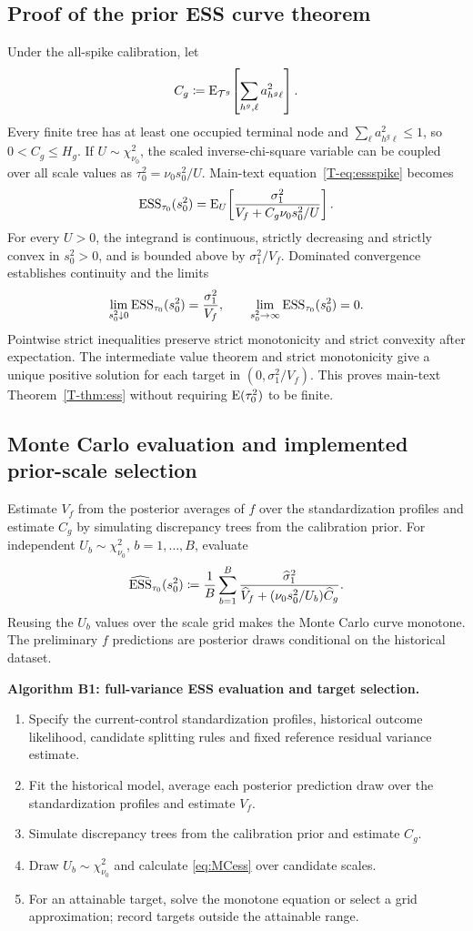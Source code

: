 \subsection{Proof of the prior ESS curve theorem}\label{sec:B.4}
Under the all-spike calibration, let
\[
C_g\coloneqq
\operatorname{E}_{\mathcal T^g}\!\left[\sum_{h^g,\ell}a_{h^g\ell}^2\right].
\]
Every finite tree has at least one occupied terminal node and
$\sum_\ell a_{h^g\ell}^2\leq1$, so $0<C_g\leq H_g$. If
$U\sim\chi^2_{\nu_0}$, the scaled inverse-chi-square variable can be coupled over all scale values as $\tau_0^2=\nu_0s_0^2/U$. Main-text equation~\ref{T-eq:essspike} becomes
\[
\operatorname{ESS}_{\tau_0}(s_0^2)
=\operatorname{E}_U\!\left[
\frac{\sigma_1^2}{V_f+C_g\nu_0s_0^2/U}
\right].
\]
For every $U>0$, the integrand is continuous, strictly decreasing and strictly convex in $s_0^2>0$, and is bounded above by $\sigma_1^2/V_f$. Dominated convergence establishes continuity and the limits
\[
\lim_{s_0^2\downarrow0}\operatorname{ESS}_{\tau_0}(s_0^2)
=\frac{\sigma_1^2}{V_f},
\qquad
\lim_{s_0^2\to\infty}\operatorname{ESS}_{\tau_0}(s_0^2)=0.
\]
Pointwise strict inequalities preserve strict monotonicity and strict convexity after expectation. The intermediate value theorem and strict monotonicity give a unique positive solution for each target in $(0,\sigma_1^2/V_f)$. This proves main-text Theorem~\ref{T-thm:ess} without requiring $\operatorname{E}(\tau_0^2)$ to be finite.

\subsection{Monte Carlo evaluation and implemented prior-scale selection}\label{sec:B.5}
Estimate $V_f$ from the posterior averages of $f$ over the standardization profiles and estimate
$C_g$ by simulating discrepancy trees from the calibration prior. For independent
$U_b\sim\chi^2_{\nu_0}$, $b=1,\ldots,B$, evaluate
\begin{equation}\label{eq:MCess}
\widehat{\operatorname{ESS}}_{\tau_0}(s_0^2)
\coloneqq\frac1B\sum_{b=1}^B
\frac{\widehat\sigma_1^2}
{\widehat V_f+(\nu_0s_0^2/U_b)\widehat C_g}.
\end{equation}
Reusing the $U_b$ values over the scale grid makes the Monte Carlo curve monotone. The preliminary $f$ predictions are posterior draws conditional on the historical dataset.

\noindent\textbf{Algorithm B1: full-variance ESS evaluation and target selection.}
\begin{enumerate}
\item Specify the current-control standardization profiles, historical outcome likelihood, candidate splitting rules and fixed reference residual variance estimate.
\item Fit the historical model, average each posterior prediction draw over the standardization profiles and estimate $V_f$.
\item Simulate discrepancy trees from the calibration prior and estimate $C_g$.
\item Draw $U_b\sim\chi^2_{\nu_0}$ and calculate \eqref{eq:MCess} over candidate scales.
\item For an attainable target, solve the monotone equation or select a grid approximation; record targets outside the attainable range.
\end{enumerate}

